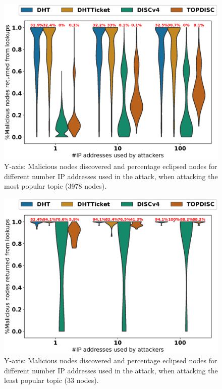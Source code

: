 \begin{figure}[!h]
\includegraphics[width=\linewidth]{results/security/violin_sybilSize_percentageMaliciousDiscovered_t0.eps}
\caption{Y-axis: Malicious nodes discovered and percentage eclipsed nodes for different number IP addresses used in the attack,  when attacking the most popular topic (3978 nodes).}
\label{fig:eclipse_sybil_t0}
\end{figure}



\begin{figure}[!h]
\includegraphics[width=\linewidth]{results/security/violin_sybilSize_percentageMaliciousDiscovered_t299.eps}
\caption{Y-axis: Malicious nodes discovered and percentage eclipsed nodes for different number IP addresses used in the attack,  when attacking the least popular topic (33 nodes).}
\label{fig:eclipse_sybil_t299}
\end{figure}



